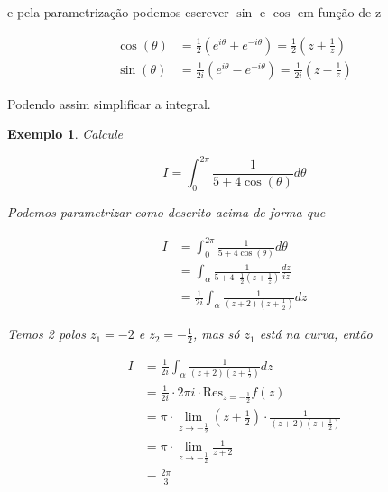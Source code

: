 \documentclass{article}
\newtheorem{ex}{Exemplo}
\begin{document}
e pela parametrização podemos escrever $\sin$ e $\cos$ em função de z  

\begin{align*}
    \cos(\theta) &= \frac{1}{2} (e^{i \theta} + e^{ - i \theta}) = \frac{1}{2} \left(z + \frac{1}{z} \right) \\
    \sin(\theta) &= \frac{1}{2i} (e^{i \theta} - e^{ - i \theta}) = \frac{1}{2 i} \left(z - \frac{1}{z} \right)
\end{align*}

Podendo assim simplificar a integral.

\begin{ex}
Calcule

\begin{equation*}
    I = \int_0^{2 \pi} \frac{1}{5 + 4 \cos(\theta)} d \theta
\end{equation*}

Podemos parametrizar como descrito acima de forma que

\begin{align*}
    I &= \int_0^{2 \pi} \frac{1}{5 + 4 \cos(\theta)} d \theta \\
    &= \int_\alpha \frac{1}{5 + 4 \cdot \frac{1}{2} (z + \frac{1}{z})} \frac{d z}{i z} \\
    &= \frac{1}{2 i} \int_\alpha \frac{1}{(z + 2) (z + \frac{1}{2})} d z
\end{align*}

Temos 2 polos $z_1 = -2$ e $z_2 = - \frac{1}{2}$, mas só $z_1$ está na curva, então

\begin{align*}
    I &= \frac{1}{2 i} \int_\alpha \frac{1}{(z + 2) (z + \frac{1}{2})} d z \\
    &= \frac{1}{2 i} \cdot 2 \pi i \cdot \mathrm{Res}_{z = - \frac{1}{2}} f(z) \\
    &= \pi \cdot \lim_{z \to - \frac{1}{2}} \left(z + \frac{1}{2} \right) \cdot \frac{1}{(z + 2) (z + \frac{1}{2})} \\
    &= \pi \cdot \lim_{z \to - \frac{1}{2}} \frac{1}{z + 2} \\
    &= \frac{2 \pi}{3}
\end{align*}
\end{ex}
\end{document}
